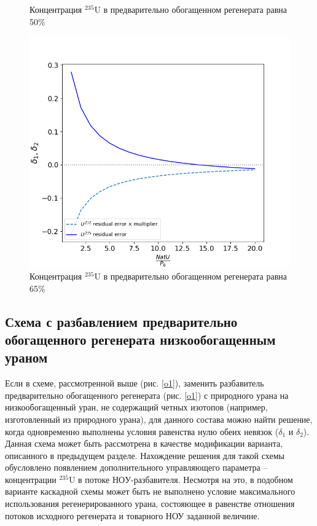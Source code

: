 \begin{figure}[ht]
\begin{minipage}{.5\textwidth}
    \caption{Концентрация $^{235}$U в предварительно обогащенном регенерата равна 50\%}
    \label{delta3}
  \end{minipage}
  \begin{minipage}{.5\textwidth}
    \centering
    \includegraphics[width=.8\linewidth]{images/plots/65}  
    \caption{Концентрация $^{235}$U в предварительно обогащенном регенерата равна 65\%}
    \label{delta4}
  \end{minipage}
 \end{figure}


\subsection{Схема с разбавлением предварительно обогащенного регенерата низкообогащенным ураном}

Если в схеме, рассмотренной выше (рис. \ref{o1}), заменить разбавитель предварительно обогащенного регенерата (рис. \ref{o1}) с природного урана на низкообогащенный уран, не содержащий четных изотопов (например, изготовленный из природного урана), для данного состава можно найти решение, когда одновременно выполнены условия равенства нулю обеих невязок ($\delta_1$ и $\delta_2$). Данная схема может быть рассмотрена в качестве модификации варианта, описанного в предыдущем разделе. Нахождение решения для такой схемы обусловлено появлением дополнительного управляющего параметра -- концентрации $^{235}$U в потоке $НОУ$-разбавителя.  Несмотря на это, в подобном варианте каскадной схемы может быть не выполнено условие максимального использования регенерированного урана, состояющее в равенстве отношения потоков исходного регенерата и товарного НОУ заданной величине.

